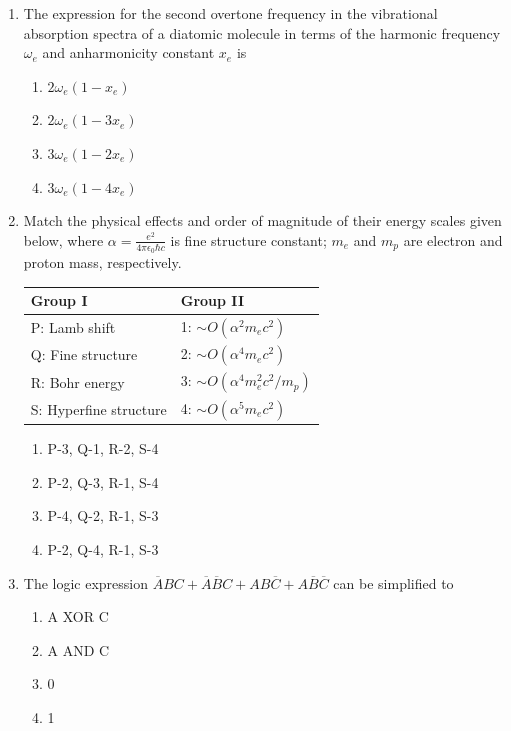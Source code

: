 \documentclass[journal,12pt,onecolumn]{IEEEtran}
\theoremstyle{remark}
\begin{document}
\begin{enumerate}
    \item The expression for the second overtone frequency in the vibrational absorption spectra of a diatomic molecule in terms of the harmonic frequency $\omega_e$ and anharmonicity constant $x_e$ is
    \hfill{} \begin{enumerate}
        \item $2\omega_e(1-x_e)$
        \item $2\omega_e(1-3x_e)$
        \item $3\omega_e(1-2x_e)$
        \item $3\omega_e(1-4x_e)$
    \end{enumerate}

    \item Match the physical effects and order of magnitude of their energy scales given below, where $\alpha = \frac{e^2}{4\pi\epsilon_0\hbar c}$ is fine structure constant; $m_e$ and $m_p$ are electron and proton mass, respectively.
    \begin{center}
    \begin{tabular}{|l|l|}
        \hline
        \textbf{Group I} & \textbf{Group II} \\
        \hline
        P: Lamb shift & 1: $\sim O(\alpha^2 m_e c^2)$ \\ \hline
        Q: Fine structure & 2: $\sim O(\alpha^4 m_e c^2)$ \\ \hline
        R: Bohr energy & 3: $\sim O(\alpha^4 m_e^2 c^2/m_p)$ \\ \hline
        S: Hyperfine structure & 4: $\sim O(\alpha^5 m_e c^2)$ \\
        \hline
    \end{tabular}
    \end{center}
    \hfill{} \begin{enumerate}
        \item P-3, Q-1, R-2, S-4
        \item P-2, Q-3, R-1, S-4
        \item P-4, Q-2, R-1, S-3
        \item P-2, Q-4, R-1, S-3
    \end{enumerate}

    \item The logic expression $\overline{A}BC + \overline{A}\overline{B}C + AB\overline{C} + A\overline{B}\overline{C}$ can be simplified to
    \hfill{} \begin{enumerate}
        \item A XOR C
        \item A AND C
        \item 0
        \item 1
    \end{enumerate}


\end{enumerate}
\end{document}
